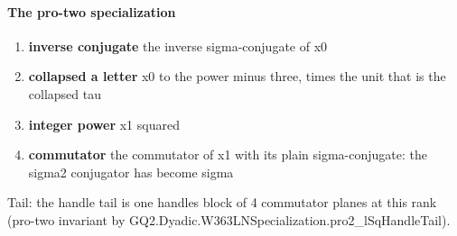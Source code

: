 \paragraph{The pro-two specialization}
\begin{enumerate}
\item[(1)] \textbf{inverse conjugate} the inverse sigma-conjugate of x0
\item[(2)] \textbf{collapsed a letter} x0 to the power minus three, times the unit that is the collapsed tau
\item[(3)] \textbf{integer power} x1 squared
\item[(4)] \textbf{commutator} the commutator of x1 with its plain sigma-conjugate: the sigma2 conjugator has become sigma
\end{enumerate}
Tail: the handle tail is one handles block of 4 commutator planes at this rank (pro-two invariant by GQ2.Dyadic.W363LNSpecialization.pro2\_lSqHandleTail).
